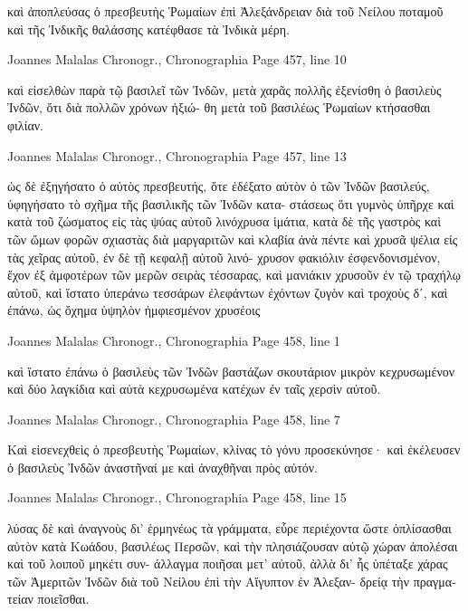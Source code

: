 \documentclass[12pt,letterpaper,twoside,final]{memoir}
\begin{document}
\begin{greek}
                                                                        καὶ 
ἀποπλεύσας ὁ πρεσβευτὴς Ῥωμαίων ἐπὶ Ἀλεξάνδρειαν διὰ τοῦ 
Νείλου ποταμοῦ καὶ τῆς Ἰνδικῆς θαλάσσης κατέφθασε τὰ Ἰνδικὰ 
μέρη. 



Joannes Malalas Chronogr., Chronographia 
Page 457, line 10

       καὶ εἰσελθὼν παρὰ τῷ βασιλεῖ τῶν Ἰνδῶν, μετὰ χαρᾶς 
πολλῆς ἐξενίσθη ὁ βασιλεὺς Ἰνδῶν, ὅτι διὰ πολλῶν χρόνων ἠξιώ-
θη μετὰ τοῦ βασιλέως Ῥωμαίων κτήσασθαι φιλίαν. 



Joannes Malalas Chronogr., Chronographia 
Page 457, line 13

                                                       ὡς δὲ 
ἐξηγήσατο ὁ αὐτὸς πρεσβευτής, ὅτε ἐδέξατο αὐτὸν ὁ τῶν Ἰνδῶν 
βασιλεύς, ὑφηγήσατο τὸ σχῆμα τῆς βασιλικῆς τῶν Ἰνδῶν κατα-
στάσεως ὅτι γυμνὸς ὑπῆρχε καὶ κατὰ τοῦ ζώσματος εἰς τὰς ψύας 
αὐτοῦ λινόχρυσα ἱμάτια, κατὰ δὲ τῆς γαστρὸς καὶ τῶν ὤμων 
φορῶν σχιαστὰς διὰ μαργαριτῶν καὶ κλαβία ἀνὰ πέντε καὶ 
χρυσᾶ ψέλια εἰς τὰς χεῖρας αὐτοῦ, ἐν δὲ τῇ κεφαλῇ αὐτοῦ λινό-
χρυσον φακιόλιν ἐσφενδονισμένον, ἔχον ἐξ ἀμφοτέρων τῶν μερῶν 
σειρὰς τέσσαρας, καὶ μανιάκιν χρυσοῦν ἐν τῷ τραχήλῳ αὐτοῦ, 
καὶ ἵστατο ὑπεράνω τεσσάρων ἐλεφάντων ἐχόντων ζυγὸν καὶ 
τροχοὺς δʹ, καὶ ἐπάνω, ὡς ὄχημα ὑψηλὸν ἠμφιεσμένον χρυσέοις 




Joannes Malalas Chronogr., Chronographia 
Page 458, line 1

                        καὶ ἵστατο ἐπάνω ὁ βασιλεὺς τῶν Ἰνδῶν 
βαστάζων σκουτάριον μικρὸν κεχρυσωμένον καὶ δύο λαγκίδια 
καὶ αὐτὰ κεχρυσωμένα κατέχων ἐν ταῖς χερσὶν αὐτοῦ. 



Joannes Malalas Chronogr., Chronographia 
Page 458, line 7

Καὶ εἰσενεχθεὶς ὁ πρεσβευτὴς Ῥωμαίων, κλίνας τὸ γόνυ 
προσεκύνησε· καὶ ἐκέλευσεν ὁ βασιλεὺς Ἰνδῶν ἀναστῆναί με καὶ 
ἀναχθῆναι πρὸς αὐτόν. 



Joannes Malalas Chronogr., Chronographia 
Page 458, line 15

                                                      λύσας δὲ καὶ 
ἀναγνοὺς δι' ἑρμηνέως τὰ γράμματα, εὗρε περιέχοντα ὥστε 
ὁπλίσασθαι αὐτὸν κατὰ Κωάδου, βασιλέως Περσῶν, καὶ τὴν 
πλησιάζουσαν αὐτῷ χώραν ἀπολέσαι καὶ τοῦ λοιποῦ μηκέτι συν-
άλλαγμα ποιῆσαι μετ' αὐτοῦ, ἀλλὰ δι' ἧς ὑπέταξε χάρας τῶν 
Ἀμεριτῶν Ἰνδῶν διὰ τοῦ Νείλου ἐπὶ τὴν Αἴγυπτον ἐν Ἀλεξαν-
δρείᾳ τὴν πραγματείαν ποιεῖσθαι. 




\end{greek}
\end{document}
